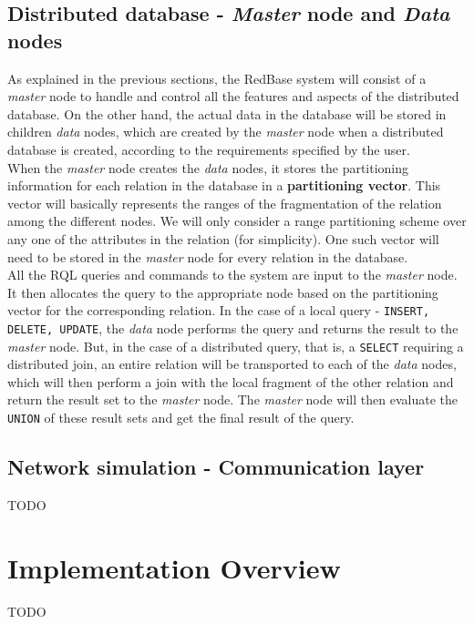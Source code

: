 \documentclass[letterpaper,11pt]{article}
\begin{document}
\subsection{Distributed database - \textit{Master} node and \textit{Data} nodes}
As explained in the previous sections, the RedBase system will consist of a \textit{master} node
to handle and control all the features and aspects of the distributed database. On the other hand,
the actual data in the database will be stored in children \textit{data} nodes, which are created
by the \textit{master} node when a distributed database is created, according to the requirements
specified by the user.\\

When the \textit{master} node creates the \textit{data} nodes, it stores the partitioning information
for each relation in the database in a \textbf{partitioning vector}. This vector will basically represents
the ranges of the fragmentation of the relation among the different nodes. We will only consider a
range partitioning scheme over any one of the attributes in the relation (for simplicity). One such
vector will need to be stored in the \textit{master} node for every relation in the database.\\

All the RQL queries and commands to the system are input to the \textit{master} node. It then allocates
the query to the appropriate node based on the partitioning vector for the corresponding relation. In
the case of a local query - \texttt{INSERT, DELETE, UPDATE}, the \textit{data} node performs the query
and returns the result to the \textit{master} node. But, in the case of a distributed query, that is,
a \texttt{SELECT} requiring a distributed join, an entire relation will be transported to each of the
\textit{data} nodes, which will then perform a join with the local fragment of the other relation and
return the result set to the \textit{master} node. The \textit{master} node will then evaluate the
\texttt{UNION} of these result sets and get the final result of the query.

\subsection{Network simulation - Communication layer}
TODO

\section{Implementation Overview}
TODO
\end{document}
